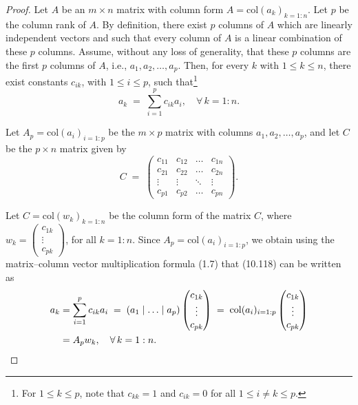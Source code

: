 \begin{proof}
Let $A$ be an $m \times n$ matrix with column form $A = \mathrm{col}(a_k)_{k=1:n}$.
Let $p$ be the column rank of $A$. By definition, there exist $p$ columns of $A$
which are linearly independent vectors and such that every column of $A$ is a
linear combination of these $p$ columns. Assume, without any loss of generality,
that these $p$ columns are the first $p$ columns of $A$, i.e., $a_1, a_2, \ldots,
a_p$. Then, for every $k$ with $1 \le k \le n$, there exist constants $c_{ik}$,
with $1 \le i \le p$, such that\footnote{For $1 \le k \le p$, note that $c_{kk}=1$
and $c_{ik}=0$ for all $1 \le i \ne k \le p$.}
\begin{equation}
a_k \;=\; \sum_{i=1}^p c_{ik}a_i, \quad \forall\, k = 1:n.
\end{equation}

Let $A_p = \mathrm{col}(a_i)_{i=1:p}$ be the $m \times p$ matrix with columns $a_1,
a_2, \ldots, a_p$, and let $C$ be the $p \times n$ matrix given by
\[
C \;=\; \begin{pmatrix} c_{11} & c_{12} & \ldots & c_{1n} \\
c_{21} & c_{22} & \ldots & c_{2n} \\ \vdots & \vdots & \ddots & \vdots \\
c_{p1} & c_{p2} & \ldots & c_{pn} \end{pmatrix}.
\]

Let $C = \mathrm{col}(w_k)_{k=1:n}$ be the column form of the matrix $C$, where
$w_k = \begin{pmatrix} c_{1k} \\ \vdots \\ c_{pk} \end{pmatrix}$, for all $k = 1:n$.
Since $A_p = \mathrm{col}(a_i)_{i=1:p}$, we obtain using the matrix--column vector
multiplication formula (1.7) that (10.118) can be written as
\begin{align}
a_k &= \sum_{i=1}^p c_{ik}a_i \;=\; (a_1 \mid \ldots \mid a_p)
\begin{pmatrix} c_{1k} \\ \vdots \\ c_{pk} \end{pmatrix} \;=\;
\mathrm{col}(a_i)_{i=1:p}\begin{pmatrix} c_{1k} \\ \vdots \\ c_{pk} \end{pmatrix}
\notag \\
&= A_pw_k, \quad \forall\, k = 1:n.
\end{align}


\end{proof}
